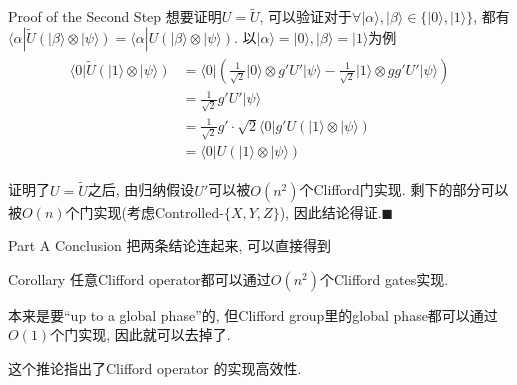 \documentclass{beamer}
\def \ket#1{|#1 \rangle}
\def \bra#1{\langle #1|}
\begin{document}
\begin{frame}{Proof of the Second Step}
	想要证明$U = \tilde{U}$, 可以验证对于$\forall \ket{\alpha}, \ket{\beta} \in \{\ket0, \ket1\}$, 都有$\bra{\alpha}\tilde{U}(\ket{\beta}\otimes\ket{\psi}) = \bra{\alpha}U(\ket{\beta}\otimes\ket{\psi})$. \pause 以$\ket{\alpha} = \ket{0}, \ket{\beta} = \ket{1}$为例
	\begin{align*}
	\begin{split}
	\bra{0} \tilde{U} (\ket{1} \otimes \ket{\psi}) &= 
	\bra{0}(\frac{1}{\sqrt 2}\ket{0}\otimes g'U'\ket{\psi} - \frac{1}{\sqrt 2}\ket{1}\otimes gg'U'\ket{\psi})\\
	&= \frac{1}{\sqrt 2}g'U'\ket{\psi}\\
	&= \frac{1}{\sqrt 2}g' \cdot \sqrt2\bra{0}g'U(\ket{1}\otimes\ket{\psi})\\
	&= \bra{0} U (\ket{1} \otimes \ket{\psi})
	\end{split}
	\end{align*}
	
	证明了$U = \tilde U $之后, 由归纳假设$U'$可以被$O(n^2)$个Clifford门实现. 剩下的部分可以被$O(n)$个门实现(考虑Controlled-$\{X, Y, Z\}$), 因此结论得证.\hfill$\blacksquare$
\end{frame}
\begin{frame}{Part A Conclusion}
	把两条结论连起来, 可以直接得到
	\begin{block}{Corollary}
		任意Clifford operator都可以通过$O(n^2)$个Clifford gates实现.
	\end{block}

	本来是要“up to a global phase”的, 但Clifford group里的global phase都可以通过$O(1)$个门实现, 因此就可以去掉了.
	
	这个推论指出了Clifford operator 的实现高效性.
\end{frame}
\end{document}
